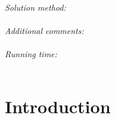 \documentclass[preprint,12pt]{elsarticle}
\begin{document}
\begin{small}
   \\
{\em Solution method:}\\
   \\
{\em Additional comments:}\\
   \\
{\em Running time:}\\
   \\

\end{small}


\section{Introduction}
\label{sec:intro}
\end{document}
